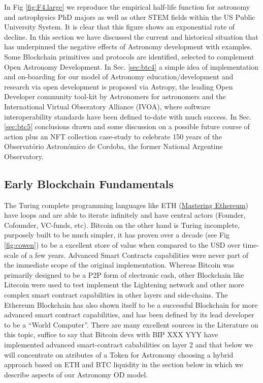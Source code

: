 \documentclass[final,5p,times,twocolumn,authoryear]{elsarticle}
\begin{document}
In Fig \ref{fig:F4.large} we reproduce the empirical half-life function for astronomy and astrophysics PhD majors as well as other STEM fields within the US Public University System. It is clear that this figure shows an exponential rate of decline.  In this section we have discussed the current and historical situation that has underpinned the negative effects of Astronomy development with examples. Some Blockchain primitives and protocols are identified, selected to complement Open Astronomy Development.  In Sec. \ref{sec:btc4} a simple idea of implementation and on-boarding for our model of Astronomy education/development and research via open development is proposed via Astropy, the leading Open Developer community tool-kit by Astronomers for astronomers and the International Virtual Obseratory Alliance (IVOA), where software interoperability standards have been defined to-date with much success. In Sec. \ref{sec:btc5} conclusions drawn and some discussion on a possible future course of action plus an NFT collection case-study to celebrate 150 years of the Observat\'orio Astron\'omico de Cordoba, the former National Argentine Observatory. 

\subsection{Early Blockchain Fundamentals}
\label{subsec:fundamentals}

The Turing complete programming languages like ETH (\href{https://github.com/ethereumbook/ethereumbook#readme}{Mastering Ethereum}) have loops and are able to iterate infinitely and have central actors (Founder, Cofounder, VC-funds, etc). Bitcoin on the other hand is Turing incomplete, purposely built to be much simpler, it has proven over a decade (see Fig \ref{fig:cowen}) to be a excellent store of value when compared to the USD over time-scale of a few years. Advanced Smart Contracts capabilities were never part of the immediate scope of the original implementation. Whereas Bitcoin was primarily designed to be a P2P form of electronic cash, other Blockchain like Litecoin were used to test implement the Lightening network and other more complex smart contract capabilities in other layers and side-chains. The Ethereum Blockchain has also shown itself to be a successful Blockchain for more advanced smart contract capabilities, and has been defined by its lead developer to be a “World Computer”. There are many excellent sources in the Literature on this topic, suffice to say that Bitcoin devs with BIP XXX YYY have implemented advanced smart-contract cababilities on layer 2 and that below we will concentrate on atributes of a Token for Astronomy choosing a hybrid approach based on ETH and BTC liquidity in the section below in which we describe aspects of our Astronomy OD model.
 
\end{document}
